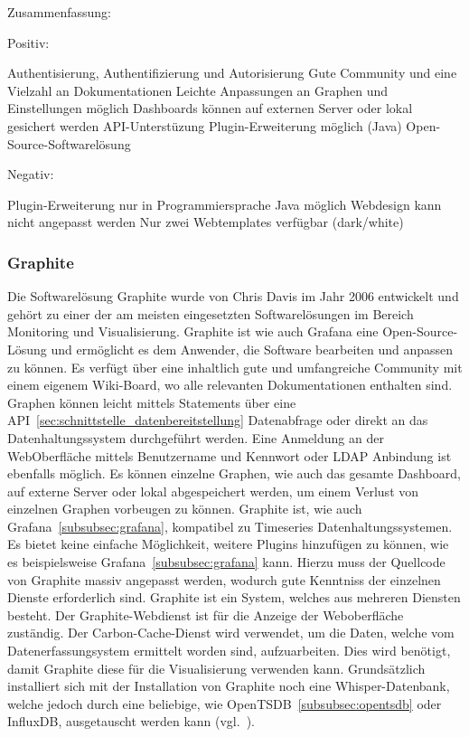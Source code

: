 {Zusammenfassung:

Positiv:

\begin{outline}
  \1 Authentisierung, Authentifizierung und Autorisierung
  \1 Gute Community und eine Vielzahl an Dokumentationen
  \1 Leichte Anpassungen an Graphen und Einstellungen möglich
  \1 Dashboards können auf externen Server oder lokal gesichert werden
  \1 API\hyp{}Unterstüzung
  \1 Plugin\hyp{}Erweiterung möglich (Java)
  \1 Open\hyp{}Source\hyp{}Softwarelösung
\end{outline}

Negativ:

\begin{outline}
  \1 Plugin\hyp{}Erweiterung nur in Programmiersprache Java möglich
  \1 Webdesign kann nicht angepasst werden
  \1 Nur zwei Webtemplates verfügbar (dark/white)
\end{outline}
\mr%

\subsubsection{Graphite}
\label{subsubsec:graphite}
Die Softwarelösung Graphite wurde von Chris Davis im Jahr 2006 entwickelt und
gehört zu einer der am meisten eingesetzten Softwarelösungen im Bereich
Monitoring und Visualisierung. Graphite ist wie auch Grafana eine
Open\hyp{}Source\hyp{}Lösung und ermöglicht es dem Anwender, die Software
bearbeiten und anpassen zu können. Es verfügt über eine inhaltlich gute und
umfangreiche Community mit einem eigenem Wiki\hyp{}Board, wo alle relevanten
Dokumentationen enthalten sind. Graphen können leicht mittels Statements über
eine API~\ref{sec:schnittstelle_datenbereitstellung} Datenabfrage oder direkt
an das Datenhaltungssystem durchgeführt werden. Eine Anmeldung an der
WebOberfläche mittels Benutzername und Kennwort oder \gls{LDAP} Anbindung ist
ebenfalls möglich. Es können einzelne Graphen, wie auch das gesamte Dashboard,
auf externe Server oder lokal abgespeichert werden, um einem Verlust von
einzelnen Graphen vorbeugen zu können. Graphite ist, wie auch
Grafana~\ref{subsubsec:grafana}, kompatibel zu Timeseries
Datenhaltungssystemen. Es bietet keine einfache Möglichkeit, weitere Plugins
hinzufügen zu können, wie es beispielsweise Grafana~\ref{subsubsec:grafana}
kann. Hierzu muss der Quellcode von Graphite massiv angepasst werden, wodurch
gute Kenntniss der einzelnen Dienste erforderlich sind. Graphite ist ein
System, welches aus mehreren Diensten besteht. Der Graphite\hyp{}Webdienst ist
für die Anzeige der Weboberfläche zuständig. Der Carbon\hyp{}Cache\hyp{}Dienst
wird verwendet, um die Daten, welche vom Datenerfassungsystem ermittelt worden
sind, aufzuarbeiten. Dies wird benötigt, damit Graphite diese für die
Visualisierung verwenden kann. Grundsätzlich installiert sich mit der
Installation von Graphite noch eine Whisper\hyp{}Datenbank, welche jedoch durch
eine beliebige, wie OpenTSDB~\ref{subsubsec:opentsdb} oder InfluxDB,
ausgetauscht werden kann (vgl.~\cite{graphite}).

}
